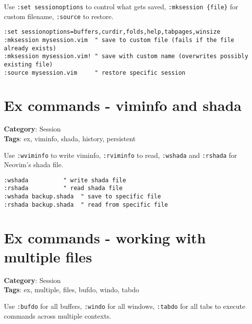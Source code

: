 {{{{{{{{{{{{{{Use {\footnotesize \Verb§:set sessionoptions§} to control what gets saved, {\footnotesize \Verb§:mksession {file}§} for custom filename, {\footnotesize \Verb§:source§} to restore.

\begin{Exa*}{}
\begin{Verbatim}[fontsize=\footnotesize, breaklines, breakanywhere]
:set sessionoptions=buffers,curdir,folds,help,tabpages,winsize
:mksession mysession.vim  " save to custom file (fails if the file already exists)
:mksession mysession.vim! " save with custom name (overwrites possibly existing file)
:source mysession.vim     " restore specific session
\end{Verbatim}
\end{Exa*}

\section{Ex commands - viminfo and shada}

\textbf{Category}: Session\\ \textbf{Tags}: ex, viminfo, shada, history, persistent
\vspace{0.5cm}

Use {\footnotesize \Verb§:wviminfo§} to write viminfo, {\footnotesize \Verb§:rviminfo§} to read, {\footnotesize \Verb§:wshada§} and {\footnotesize \Verb§:rshada§} for Neovim's shada file.

\begin{Exa*}{}
\begin{Verbatim}[fontsize=\footnotesize, breaklines, breakanywhere]
:wshada          " write shada file
:rshada          " read shada file
:wshada backup.shada  " save to specific file
:rshada backup.shada  " read from specific file
\end{Verbatim}
\end{Exa*}

\section{Ex commands - working with multiple files}

\textbf{Category}: Session\\ \textbf{Tags}: ex, multiple, files, bufdo, windo, tabdo
\vspace{0.5cm}

Use {\footnotesize \Verb§:bufdo§} for all buffers, {\footnotesize \Verb§:windo§} for all windows, {\footnotesize \Verb§:tabdo§} for all tabs to execute commands across multiple contexts.

}}}}}}}}}}}}}}
